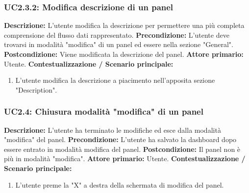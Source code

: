                 \subsubsection{UC2.3.2: Modifica descrizione di un panel}
                    \textbf{Descrizione:} L’utente modifica la descrizione per permettere una più completa comprensione del flusso dati rappresentato.
                    \newline
                    \textbf{Precondizione:} L'utente deve trovarsi in modalità "modifica" di un panel ed essere nella sezione "General".
                    \newline
                    \textbf{Postcondizione:} Viene modificata la descrizione del panel.
                    \newline
                    \textbf{Attore primario:} Utente.
                    \newline
                    \textbf{Contestualizzazione / Scenario principale:} \begin{enumerate}
                        \item L’utente modifica la descrizione a piacimento nell'apposita sezione "Description".
                    \end{enumerate}
                    
                \subsubsection{UC2.4: Chiusura modalità "modifica" di un panel}
                    \textbf{Descrizione:} L’utente ha terminato le modifiche ed esce dalla modalità "modifica" del panel.
                    \newline
                    \textbf{Precondizione:} L'utente ha salvato la dashboard dopo essere entrato in modalità modifica del panel.
                    \newline
                    \textbf{Postcondizione:} Il panel non è più in modalità "modifica".
                    \newline
                    \textbf{Attore primario:} Utente.
                    \newline
                    \textbf{Contestualizzazione / Scenario principale:} \begin{enumerate}
                        \item L’utente preme la "X" a destra della schermata di modifica del panel.
                    \end{enumerate}
                
